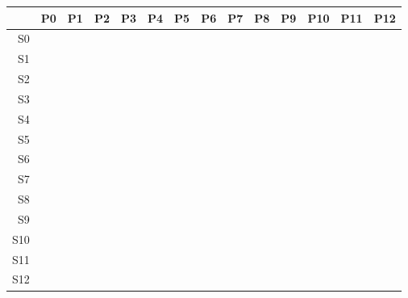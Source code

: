 
\begin{tabular}{| r || c | c | c | c | c | c | c | c | c | c | c | c | c |}
 \hline
    & P0 & P1 & P2 & P3 & P4 & P5 & P6 & P7 & P8 & P9 & P10 & P11 & P12 \\
\hline
 \hline
S0 &   &   &   &   &   &   &   &   &   &   &   &   &   \\
\hline
S1 &   &   &   &   &   &   &   &   &   &   &   &   &   \\
\hline
S2 &   &   &   &   &   &   &   &   &   &   &   &   &   \\
\hline
S3 &   &   &   &   &   &   &   &   &   &   &   &   &   \\
\hline
S4 &   &   &   &   &   &   &   &   &   &   &   &   &   \\
\hline
S5 &   &   &   &   &   &   &   &   &   &   &   &   &   \\
\hline
S6 &   &   &   &   &   &   &   &   &   &   &   &   &   \\
\hline
S7 &   &   &   &   &   &   &   &   &   &   &   &   &   \\
\hline
S8 &   &   &   &   &   &   &   &   &   &   &   &   &   \\
\hline
S9 &   &   &   &   &   &   &   &   &   &   &   &   &   \\
\hline
S10 &   &   &   &   &   &   &   &   &   &   &   &   &   \\
\hline
S11 &   &   &   &   &   &   &   &   &   &   &   &   &   \\
\hline
S12 &   &   &   &   &   &   &   &   &   &   &   &   &   \\
\hline
\end{tabular}

